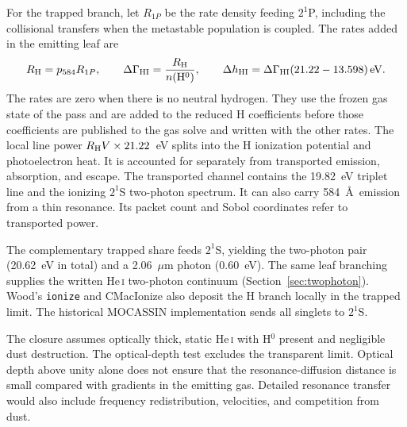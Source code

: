 \documentclass[english,a4paper]{my_memo}
\newcommand{\code}[1]{\texttt{#1}}
\begin{document}
For the trapped branch, let $R_{1P}$ be the rate density feeding $2^1$P,
including the collisional transfers when the metastable population is coupled.
The rates added in the emitting leaf are
\begin{equation}
 R_{\rm H}=p_{584}R_{1P},\qquad
 \Delta\Gamma_{\rm HI}=\frac{R_{\rm H}}{n({\rm H^0})},\qquad
 \Delta h_{\rm HI}=\Delta\Gamma_{\rm HI}(21.22-13.598)\,{\rm eV}.
\end{equation}
The rates are zero when there is no neutral hydrogen. They use the frozen gas
state of the pass and are added to the reduced H coefficients before those
coefficients are published to the gas solve and written with the other rates.
The local line power $R_{\rm H} V\times21.22$~eV splits into the H ionization
potential and photoelectron heat. It is accounted for separately from
transported emission, absorption, and escape. The transported channel contains
the 19.82~eV triplet line and the ionizing $2^1$S two-photon spectrum. It can
also carry 584~\AA\ emission from a thin resonance. Its packet count and
Sobol coordinates refer to transported power.

The complementary trapped share feeds $2^1$S, yielding the two-photon pair
(20.62~eV in total) and a 2.06~$\mu$m photon (0.60~eV). The same leaf
branching supplies the written He\,\textsc{i} two-photon continuum
(Section~\ref{sec:twophoton}). Wood's \code{ionize} and CMacIonize
also deposit the H branch locally in the trapped limit. The historical
MOCASSIN implementation sends all singlets to $2^1$S.

The closure assumes optically thick, static He\,\textsc{i} with H$^0$
present and negligible dust destruction. The optical-depth test excludes
the transparent limit. Optical depth above unity alone does not ensure
that the resonance-diffusion distance is small compared with gradients in
the emitting gas. Detailed resonance transfer would also include frequency
redistribution, velocities, and competition from dust.
\end{document}
